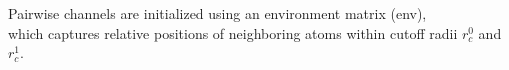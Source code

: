 \documentclass[preview]{standalone}
\begin{document}
\begin{center}
Pairwise channels are initialized using an environment matrix (env), \\which captures relative positions of neighboring atoms within cutoff radii $r_c^0$ and $r_c^1$.
\end{center}
\end{document}
